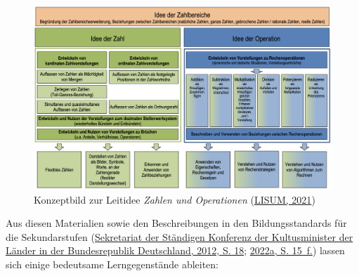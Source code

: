 \documentclass[
]{scrbook}
\theoremstyle{definition}
\theoremstyle{definition}
\theoremstyle{definition}
\theoremstyle{definition}
\theoremstyle{remark}
\begin{document}
\begin{figure}

{\centering \includegraphics[width=1\linewidth]{pictures/10-KonzeptZahl} 

}

\caption{Konzeptbild zur Leitidee \emph{Zahlen und Operationen} (\protect\hyperlink{ref-LISUM2021}{LISUM, 2021})}\label{fig:KonzeptZahl}
\end{figure}

Aus diesen Materialien sowie den Beschreibungen in den Bildungsstandards für die Sekundarstufen (\protect\hyperlink{ref-KMK:2012}{Sekretariat der Ständigen Konferenz der Kultusminister der Länder in der Bundesrepublik Deutschland, 2012, S. 18}; \protect\hyperlink{ref-SekretariatderStandigenKonferenzderKultusministerderLanderinderBundesrepublikDeutschland2022}{2022a, S. 15~f.}) lassen sich einige bedeutsame Lerngegenstände ableiten:
\end{document}
